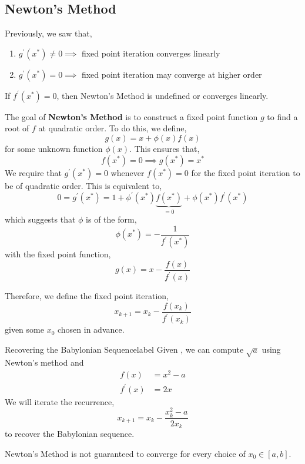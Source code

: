 \subsection{Newton's Method}
Previously, we saw that,
\begin{enumerate}
    \item $g^{\prime}(x^*) \neq 0 \implies$ fixed point iteration converges linearly
    \item $g^{\prime}(x^*) = 0 \implies$ fixed point iteration may converge at higher order
\end{enumerate}

\begin{marginfigure}
    If $f^{\prime}\left(x^*\right)=0$, then Newton's Method is undefined or converges linearly.
\end{marginfigure}

\noindent The goal of \textbf{Newton's Method} is to construct a fixed point function $g$ to find a root of $f$ at quadratic order. To do this, we define,
\[g(x) = x + \phi(x) f(x)\]
for some unknown function $\phi(x)$. This ensures that,
\[f\left(x^*\right)=0 \implies g\left(x^*\right)=x^*\]
We require that $g^{\prime}(x^*) = 0$ whenever $f(x^*) = 0$ for the fixed point iteration to be of quadratic order. This is equivalent to,
\[0=g^{\prime}\left(x^*\right)=1+\phi^{\prime}\left(x^*\right) \underbrace{f\left(x^*\right)}_{=0}+\phi\left(x^*\right) f^{\prime}\left(x^*\right)\]
which suggests that $\phi$ is of the form,
\[\phi\left(x^*\right)=-\frac{1}{f^{\prime}\left(x^*\right)}\]
with the fixed point function,
\[g(x)=x-\frac{f(x)}{f^{\prime}(x)}\]

\noindent Therefore, we define the fixed point iteration,
\[x_{k+1}=x_k-\frac{f\left(x_k\right)}{f^{\prime}\left(x_k\right)}\]
given some $x_0$ chosen in advance.

\begin{ex}{Recovering the Babylonian Sequence}{label}
    Given , we can compute $\sqrt{a}$ using Newton's method and
    \begin{align*}
        f(x) &= x^2 - a \\
        f^{\prime}(x) &= 2 x
    \end{align*}
    We will iterate the recurrence,
    \[x_{k+1}=x_k-\frac{x_k^2-a}{2 x_k}\]
    to recover the Babylonian sequence.
\end{ex}

\begin{marginfigure}
    Newton's Method is not guaranteed to converge for every choice of $x_0 \in [a, b]$.
\end{marginfigure}

